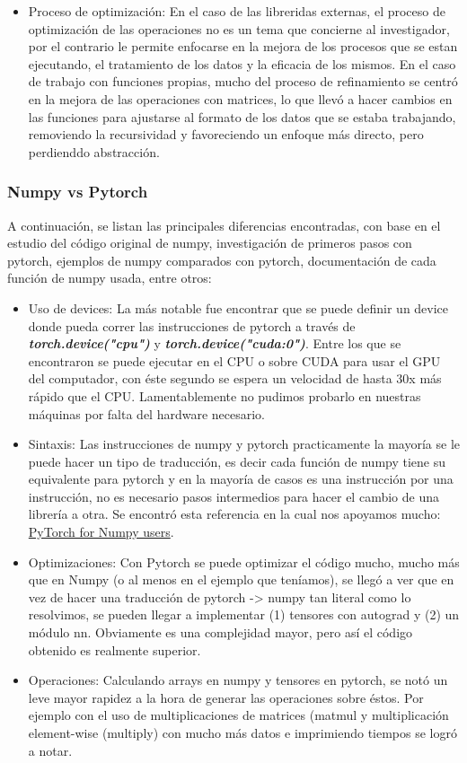 \documentclass[12pt]{article}
\begin{document}
\begin{itemize}
    \item Proceso de optimización: En el caso de las libreridas externas, el proceso de optimización de las operaciones no es un tema que concierne al investigador, por el contrario le permite enfocarse en la mejora de los procesos que se estan ejecutando, el tratamiento de los datos y la eficacia de los mismos. En el caso de trabajo con funciones propias, mucho del proceso de refinamiento se centró en la mejora de las operaciones con matrices, lo que llevó a hacer cambios en las funciones para ajustarse al formato de los datos que se estaba trabajando, removiendo la recursividad y favoreciendo un enfoque más directo, pero perdienddo abstracción. 
\end{itemize}


\subsubsection*{Numpy vs Pytorch}
A continuación, se listan las principales diferencias encontradas, con base en el estudio del código original de numpy, investigación de primeros pasos con pytorch, ejemplos de numpy comparados con pytorch, documentación de cada función de numpy usada, entre otros:
\begin{itemize}
    \item Uso de devices: La más notable fue encontrar que se puede definir un device donde pueda correr las instrucciones de pytorch a través de \textit{\textbf{torch.device("cpu")}} y \textit{\textbf{torch.device("cuda:0")}}. Entre los que se encontraron se puede ejecutar en el CPU o sobre CUDA para usar el GPU del computador, con éste segundo se espera un velocidad de hasta 30x más rápido que el CPU. Lamentablemente no pudimos probarlo en nuestras máquinas por falta del hardware necesario. 
    \item Sintaxis: Las instrucciones de numpy y pytorch practicamente la mayoría se le puede hacer un tipo de traducción, es decir cada función de numpy tiene su equivalente para pytorch y en la mayoría de casos es una instrucción por una instrucción, no es necesario pasos intermedios para hacer el cambio de una librería a otra. Se encontró esta referencia en la cual nos apoyamos mucho: \href{https://github.com/wkentaro/pytorch-for-numpy-users}{PyTorch for Numpy users}.
    \item Optimizaciones: Con Pytorch se puede optimizar el código mucho, mucho más que en Numpy (o al menos en el ejemplo que teníamos), se llegó a ver que en vez de hacer una traducción de pytorch -> numpy tan literal como lo resolvimos, se pueden llegar a implementar (1) tensores con autograd y (2) un módulo nn. Obviamente es una complejidad mayor, pero así el código obtenido es realmente superior.
    \item Operaciones: Calculando arrays en numpy y tensores en pytorch, se notó un leve mayor rapidez a la hora de generar las operaciones sobre éstos. Por ejemplo con el uso de multiplicaciones de matrices (matmul y multiplicación element-wise (multiply) con mucho más datos e imprimiendo tiempos se logró a notar.
    
\end{itemize}
\end{document}
